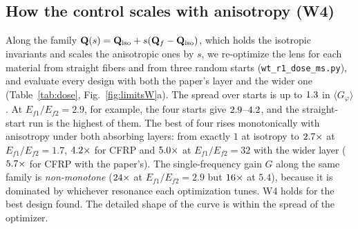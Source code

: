 \subsection{How the control scales with anisotropy (W4)}\label{sec:dose}
Along the family $\mathbf Q(s)=\mathbf Q_{\rm iso}+s(\mathbf Q_f-\mathbf Q_{\rm iso})$, which holds the isotropic invariants
and scales the anisotropic ones by $s$, we re-optimize the lens for each material from straight fibers
and from three random starts (\texttt{wt\_r1\_dose\_ms.py}), and evaluate every design with both the
paper's layer and the wider one (Table~\ref{tab:dose}, Fig.~\ref{fig:limitsW}a). The spread over starts is up
to $1.3$ in $\langle G_\varphi\rangle$. At $E_{f1}/E_{f2}=2.9$, for example, the four starts give
$2.9$--$4.2$, and the straight-start run is the highest of them. The
best of four rises monotonically with anisotropy under both absorbing layers: from exactly $1$ at
isotropy to $2.7\times$ at $E_{f1}/E_{f2}=1.7$, $4.2\times$ for CFRP and
$5.0\times$ at $E_{f1}/E_{f2}=32$ with the wider layer ($5.7\times$ for CFRP with the
paper's). The single-frequency gain $G$ along the same family is \emph{non-monotone} ($24\times$ at
$E_{f1}/E_{f2}=2.9$ but $16\times$ at $5.4$), because it is dominated by whichever resonance each
optimization tunes. W4 holds for the best design found. The detailed shape of the curve is within the
spread of the optimizer.

\begin{table}[!tbp]
\centering\small
\caption{Lens re-optimized for each lamina of the anisotropy family. $s_{20}$: channeling share
(Sec.~\ref{sec:theory}); $G(40)$, $G_\varphi(40)$: the straight-start run; last two columns: range of
$\langle G_\varphi\rangle_{\rm band}$ over four starts with the paper's absorbing layer and with the layer twice as
wide.}\label{tab:dose}
\end{table}

